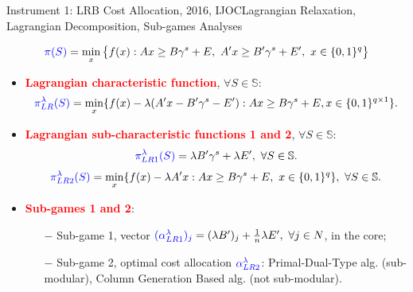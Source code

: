 \documentclass[14pt]{beamer}
\begin{document}
\begin{frame}{Instrument 1: LRB Cost Allocation, {\footnotesize 2016, IJOC}}{Lagrangian Relaxation, Lagrangian Decomposition, Sub-games Analyses}
\footnotesize
\vspace{-7mm}
\begin{shaded}
\vspace{-1mm}
\begin{equation*}\label{eqn:orgc}
\textcolor{blue}{\pi(S)} = \min_{x} \big\{ f(x):Ax \geq B\gamma^s + E, ~A'x \geq B'\gamma^s + E', ~x \in \{0,1\}^{q} \big\}
\end{equation*}
\vspace{-5mm}
\end{shaded}
\vspace{-5mm}
\begin{itemize}
\footnotesize
\item  \textcolor{red}{\bf Lagrangian characteristic function}, $\forall S \in \mathbb{S}$:
\begin{eqnarray*}
\textcolor{blue}{\pi_{LR}^{\lambda}(S)} = \min_{x}  \{f(x)-\lambda (A'x - B'\gamma^s - E'):
       Ax \geq B\gamma^s + E, x \in \{0,1\}^{q \times 1}\}.
\end{eqnarray*}
\vspace{-6mm}
\item \textcolor{red}{\bf Lagrangian sub-characteristic functions 1 and 2}, $\forall S \in \mathbb{S}$:
\begin{eqnarray*}\label{eqn:subcf1}
\begin{aligned}
\textcolor{blue}{\pi_{LR1}^{\lambda}(S)} = \lambda  B'\gamma^s + \lambda E', ~\forall S \in \mathbb{S}.
\end{aligned}
\end{eqnarray*}
\vspace{-8mm}
\begin{eqnarray*}
\textcolor{blue}{\pi_{LR2}^{\lambda}(S)} = \min_x \{ f(x)-\lambda A'x: Ax \geq B\gamma^s + E, ~x \in \{0,1\}^{q} \}, ~\forall S \in \mathbb{S}.
\end{eqnarray*}
\vspace{-1.8em}
\item \textcolor{red}{\bf Sub-games 1 and 2}:
\begin{itemize}
\justifying
\item[$-$] Sub-game 1, vector $\textcolor{blue}{(\alpha_{LR1}^{\lambda})_j} = (\lambda B')_j + \frac{1}{n}\lambda E',~\forall j \in N$, in the core;\\
\vspace{2mm}
\item[$-$] Sub-game 2, optimal cost allocation $\textcolor{blue}{\alpha_{LR2}^{\lambda}}$: Primal-Dual-Type alg. (sub-modular), Column Generation Based alg. (not sub-modular).
\end{itemize}
\end{itemize}
\end{frame}
\end{document}
